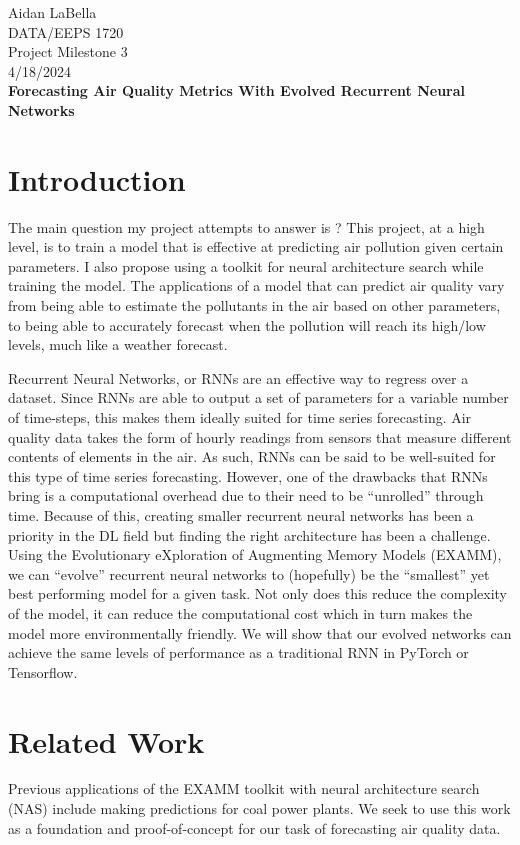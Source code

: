 \documentclass[12pt]{article}
\begin{document}
\noindent
Aidan LaBella \\
DATA/EEPS 1720 \\
Project Milestone 3\\
4/18/2024 \\

\textbf{Forecasting Air Quality Metrics With Evolved Recurrent Neural Networks}

\section{Introduction}
The main question my project attempts to answer is ? This project, at a high level, is to train a model that is effective at predicting air pollution given certain parameters. I also propose using a toolkit for neural architecture search while training the model. The applications of a model that can predict air quality vary from being able to estimate the pollutants in the air based on other parameters, to being able to accurately forecast when the pollution will reach its high/low levels, much like a weather forecast. 

Recurrent Neural Networks, or RNNs are an effective way to regress over a dataset. Since RNNs are able to output a set of parameters for a variable number of time-steps, this makes them ideally suited for time series forecasting. Air quality data takes the form of hourly readings from sensors that measure different contents of elements in the air. As such, RNNs can be said to be well-suited for this type of time series forecasting. However, one of the drawbacks that RNNs bring is a computational overhead due to their need to be “unrolled” through time. Because of this, creating smaller recurrent neural networks has been a priority in the DL field but finding the right architecture has been a challenge. Using the Evolutionary eXploration of Augmenting Memory Models (EXAMM)\cite{ororbia_investigating_2019}, we can “evolve'' recurrent neural networks to (hopefully) be the “smallest” yet best performing model for a given task. Not only does this reduce the complexity of the model, it can reduce the computational cost which in turn makes the model more environmentally friendly. We will show that our evolved networks can achieve the same levels of performance as a traditional RNN in PyTorch or Tensorflow.

\section{Related Work}
Previous applications of the EXAMM\cite{ororbia_investigating_2019} toolkit with neural architecture search (NAS) include making predictions for coal power plants\cite{kaufmann_evolving_2019}. We seek to use this work as a foundation and proof-of-concept for our task of forecasting air quality data.
\end{document}
